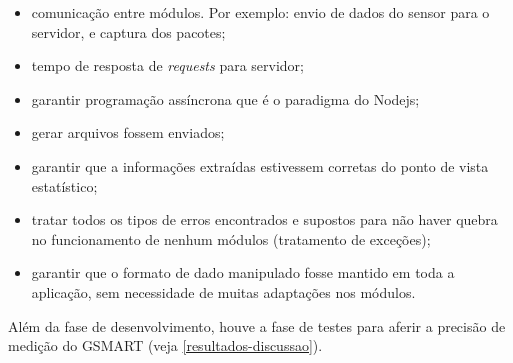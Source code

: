\begin{itemize}
  \item comunicação entre módulos. Por exemplo: envio de dados do sensor para o servidor, e captura dos pacotes;
  \item tempo de resposta de \emph{requests} para servidor;
  \item garantir programação assíncrona que é o paradigma do Nodejs;
  \item gerar arquivos fossem enviados;
  \item garantir que a informações extraídas estivessem corretas do ponto de vista estatístico;
  \item tratar todos os tipos de erros encontrados e supostos para não haver quebra no funcionamento
  de nenhum módulos (tratamento de exceções);
  \item garantir que o formato de dado manipulado fosse mantido em toda a aplicação, sem necessidade
  de muitas adaptações nos módulos.
\end{itemize}

Além da fase de desenvolvimento, houve a fase de testes para aferir a precisão de medição do GSMART (veja \autoref{resultados-discussao}).
